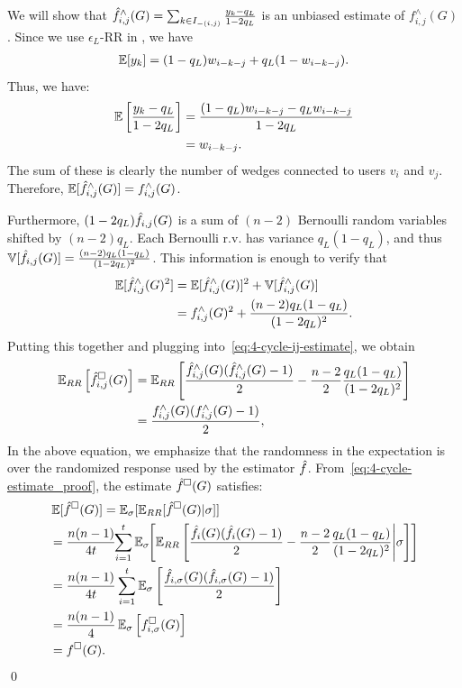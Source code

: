     We will show that $\hat{f}_{i,j}^\wedge(G) = \sum_{k \in I_{-(i,j)}}
    \frac{y_k-q_L}{1-2q_L}$ is an unbiased estimate of $f_{i,j}^\wedge(G)$.
    Since we use $\epsilon_L$-RR in \AlgWS{}, we have
    \begin{align*}
      \operatorname{\mathbb{E}}[y_{k}] = (1-q_L) w_{i-k-j} + q_L (1-w_{i-k-j}).
    \end{align*}
    Thus,  we have:
    \begin{align*}
        \operatorname{\mathbb{E}}\left[\frac{y_{k} - q_L}{1-2q_L}\right]
        &= \frac{(1-q_L) w_{i-k-j} - q_L w_{i-k-j}}{1-2q_L} \\
        &= w_{i-k-j}.
    \end{align*}
    The sum of these is clearly the number of wedges connected to users $v_i$ and $v_j$.
    Therefore, $\operatorname{\mathbb{E}}[\hat{f}_{i,j}^\wedge(G)] = f_{i,j}^\wedge(G)$.

    Furthermore, $(1-2q_L)\hat{f}_{i,j}(G)$ is a sum of $(n-2)$ Bernoulli random
    variables shifted by $(n-2)q_L$. Each Bernoulli r.v. has variance
    $q_L(1-q_L)$, and thus $\operatorname{\mathbb{V}}[\hat{f}_{i,j}(G)] = \frac{(n-2)q_L(1-q_L)}{(1-2q_L)^2}$.
    This information is enough to verify that
    \begin{align*}
        \operatorname{\mathbb{E}}[\hat{f}_{i,j}^\wedge(G)^2] &= \operatorname{\mathbb{E}}[\hat{f}_{i,j}^\wedge(G)]^2 + \operatorname{\mathbb{V}}[\hat{f}_{i,j}^\wedge(G)] \\
        &= f_{i,j}^\wedge(G)^2 + \frac{(n-2)q_L(1-q_L)}{(1-2q_L)^2}.
    \end{align*}
    Putting this together and plugging into~\eqref{eq:4-cycle-ij-estimate}, we
    obtain
    \begin{align}
        \operatorname{\mathbb{E}}_{RR}\left[\hat{f}^\square_{i,j}(G)\right] &=
        \operatorname{\mathbb{E}}_{RR}\left[\frac{\hat{f}^\wedge_{i,j}(G)(\hat{f}^\wedge_{i,j}(G)-1)}{2} -
        \frac{n-2}{2}\frac{q_L(1-q_L)}{(1-2q_L)^2} \right] \nonumber \\
        &=
        \frac{f^\wedge_{i,j}(G)(f_{i,j}^\wedge(G)-1)}{2},\label{eq:4-cycle-estimate_proof}
    \end{align}
    In the above equation, we emphasize that the randomness in the expectation is over
    the randomized response used by the estimator $\hat{f}$.
    From~\eqref{eq:4-cycle-estimate_proof}, the estimate $\hat{f}^\square(G)$ satisfies:
    \begin{align*}
      &\operatorname{\mathbb{E}}[\hat{f}^\square(G)] = \operatorname{\mathbb{E}}_\sigma[\operatorname{\mathbb{E}}_{RR}[\hat{f}^\square(G)|\sigma]] \\
        &= \frac{n(n-1)}{4t} \hspace{-1mm}\sum_{i=1}^t \operatorname{\mathbb{E}}_{\sigma}\hspace{-1mm}\left[\operatorname{\mathbb{E}}_{RR}\left[
          \frac{\hat{f}_i(G)(\hat{f}_{i}(G)-1)}{2} - \frac{n-2}{2}\frac{q_L(1-q_L)}{(1-2q_L)^2} \middle| \sigma\right]\right] \\
        &= \frac{n(n-1)}{4t} \sum_{i=1}^t
        \operatorname{\mathbb{E}}_\sigma\left[\frac{\hat{f}_{i,\sigma}(G)(\hat{f}_{i,\sigma}(G)-1)}{2}\right] \\
        &= \frac{n(n-1)}{4}\operatorname{\mathbb{E}}_{\sigma}\left[f_{i,\sigma}^\square(G)\right] \\
        &= f^\square(G).
    \end{align*}\qed

